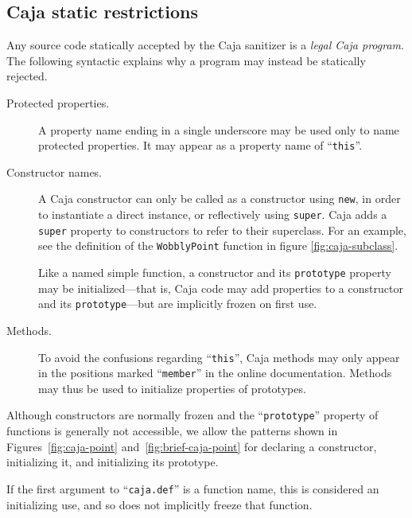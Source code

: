 \documentclass[letterpaper,twocolumn,10pt]{article}
\newcommand{\code}[1]{{\tt {#1}}}              %
\begin{document}
\subsection{Caja static restrictions}
\label{subsec:caja-static}

Any source code statically accepted by the Caja sanitizer is a \emph{legal 
Caja program}. The following syntactic explains why a program may instead be statically rejected.

\begin{description}

  \item[Protected properties.] A property name ending in a single underscore may 
  be used only to name protected properties. It may appear as a property name of 
  ``\code{this}''.
  
  \item[Constructor names.] A Caja constructor can only be called as a 
  constructor using \code{new}, in order to instantiate a direct instance, 
  or reflectively using \code{super}.  Caja adds a \code{super} property
  to constructors to refer to their superclass.  For an example, see the 
  definition of the \code{WobblyPoint} function in figure \ref{fig:caja-subclass}.
  
  Like a named simple function, a constructor and its \code{prototype} property
  may be initialized---that is, Caja code may add properties to
  a constructor and its \code{prototype}---but are implicitly frozen on first 
  use.
  
  \item[Methods.] To avoid the confusions regarding ``\code{this}'', Caja 
  methods may only appear in the positions marked ``\code{member}'' in 
  the online documentation.  Methods may 
  thus be used to initialize properties of prototypes.
  
\end{description}

Although constructors are normally frozen and the ``\code{prototype}'' 
property of functions is generally not accessible, we allow the 
patterns shown in Figures~\ref{fig:caja-point} and~\ref{fig:brief-caja-point} 
for declaring a constructor, initializing it, and initializing its prototype.

If the first argument to ``\code{caja.def}'' is a function name, this is 
considered an initializing use, and so does not implicitly freeze that 
function. 
\end{document}
